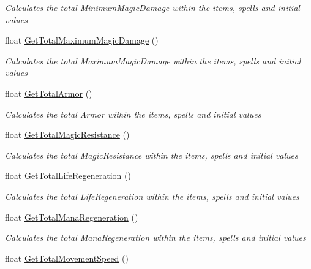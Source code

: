 \begin{DoxyCompactItemize}
\begin{DoxyCompactList}\small\item\em Calculates the total Minimum\+Magic\+Damage within the items, spells and initial values \end{DoxyCompactList}\item 
float \hyperlink{class_hel_project_1_1_features_1_1_feature_manager_a53a153e4dae0b823c34e4546968d927e}{Get\+Total\+Maximum\+Magic\+Damage} ()
\begin{DoxyCompactList}\small\item\em Calculates the total Maximum\+Magic\+Damage within the items, spells and initial values \end{DoxyCompactList}\item 
float \hyperlink{class_hel_project_1_1_features_1_1_feature_manager_aeae79cbc3c27d4fd9796269a26e3d349}{Get\+Total\+Armor} ()
\begin{DoxyCompactList}\small\item\em Calculates the total Armor within the items, spells and initial values \end{DoxyCompactList}\item 
float \hyperlink{class_hel_project_1_1_features_1_1_feature_manager_aa00b054d0ce926e2a1c0839364a55a81}{Get\+Total\+Magic\+Resistance} ()
\begin{DoxyCompactList}\small\item\em Calculates the total Magic\+Resistance within the items, spells and initial values \end{DoxyCompactList}\item 
float \hyperlink{class_hel_project_1_1_features_1_1_feature_manager_ae58d9838038b0589739863d3aefc5e9a}{Get\+Total\+Life\+Regeneration} ()
\begin{DoxyCompactList}\small\item\em Calculates the total Life\+Regeneration within the items, spells and initial values \end{DoxyCompactList}\item 
float \hyperlink{class_hel_project_1_1_features_1_1_feature_manager_a63c2d856a598a7d37c2f305e066db1d5}{Get\+Total\+Mana\+Regeneration} ()
\begin{DoxyCompactList}\small\item\em Calculates the total Mana\+Regeneration within the items, spells and initial values \end{DoxyCompactList}\item 
float \hyperlink{class_hel_project_1_1_features_1_1_feature_manager_a41763411f2016d354b8f281ea26ea79f}{Get\+Total\+Movement\+Speed} ()

\end{DoxyCompactItemize}

